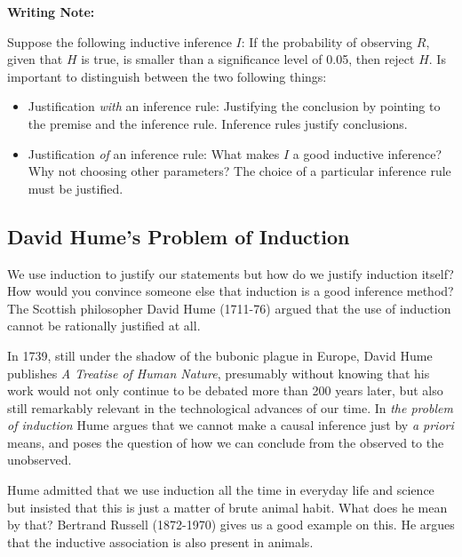 \documentclass[
]{book}
\providecommand{\tightlist}{%
  \setlength{\itemsep}{0pt}\setlength{\parskip}{0pt}}
\begin{document}
\begin{tipbox}

\textbf{Writing Note:}

Suppose the following inductive inference \(I\): If the probability of observing \(R\), given that \(H\) is true, is smaller than a significance level of 0.05, then reject \(H\). Is important to distinguish between the two following things:

\begin{itemize}
\tightlist
\item
  Justification \emph{with} an inference rule: Justifying the conclusion by pointing to the premise and the inference rule. Inference rules justify conclusions.
\item
  Justification \emph{of} an inference rule: What makes \(I\) a good inductive inference? Why not choosing other parameters? The choice of a particular inference rule must be justified.
\end{itemize}

\end{tipbox}

\hypertarget{david-humes-problem-of-induction}{%
\subsection{David Hume's Problem of Induction}\label{david-humes-problem-of-induction}}

We use induction to justify our statements but how do we justify induction itself? How would you convince someone else that induction is a good inference method? The Scottish philosopher David Hume (1711-76) argued that the use of induction cannot be rationally justified at all.

In 1739, still under the shadow of the bubonic plague in Europe, David Hume publishes \emph{A Treatise of Human Nature}, presumably without knowing that his work would not only continue to be debated more than 200 years later, but also still remarkably relevant in the technological advances of our time. In \emph{the problem of induction} Hume argues that we cannot make a causal inference just by \emph{a priori} means, and poses the question of how we can conclude from the observed to the unobserved.

Hume admitted that we use induction all the time in everyday life and science but insisted that this is just a matter of brute animal habit. What does he mean by that? Bertrand Russell (1872-1970) gives us a good example on this. He argues that the inductive association is also present in animals.
\end{document}
